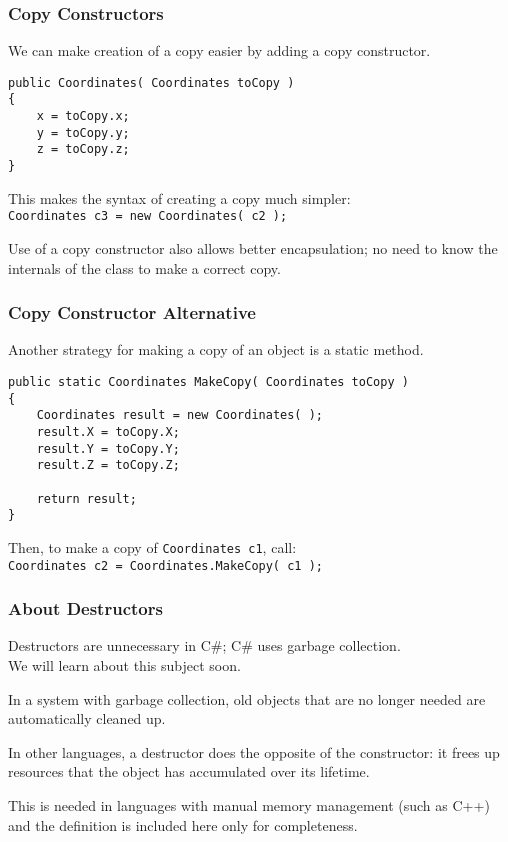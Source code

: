 \begin{frame}[fragile]
\frametitle{Copy Constructors}
We can make creation of a copy easier by adding a \alert{copy constructor}.

\begin{verbatim}
public Coordinates( Coordinates toCopy )
{
    x = toCopy.x;
    y = toCopy.y;
    z = toCopy.z;
}
\end{verbatim}

This makes the syntax of creating a copy much simpler:\\
\quad \texttt{Coordinates c3 = new Coordinates( c2 );}

Use of a copy constructor also allows better encapsulation; no need to know the internals of the class to make a correct copy.

\end{frame}

\begin{frame}[fragile]
\frametitle{Copy Constructor Alternative}
Another strategy for making a copy of an object is a static method.

\begin{verbatim}
public static Coordinates MakeCopy( Coordinates toCopy )
{
    Coordinates result = new Coordinates( );
    result.X = toCopy.X;
    result.Y = toCopy.Y;
    result.Z = toCopy.Z;

    return result;
}
\end{verbatim}


Then, to make a copy of \texttt{Coordinates c1}, call:\\
\quad \texttt{Coordinates c2 = Coordinates.MakeCopy( c1 );}

\end{frame}

\begin{frame}
\frametitle{About Destructors}

\alert{Destructors} are unnecessary in C\#; C\# uses \alert{garbage collection}.\\
\quad We will learn about this subject soon.

In a system with garbage collection, old objects that are no longer needed are automatically cleaned up.

In other languages, a destructor does the opposite of the constructor: it frees up resources that the object has accumulated over its lifetime.

This is needed in languages with manual memory management (such as C++) and the definition is included here only for completeness.

\end{frame}




